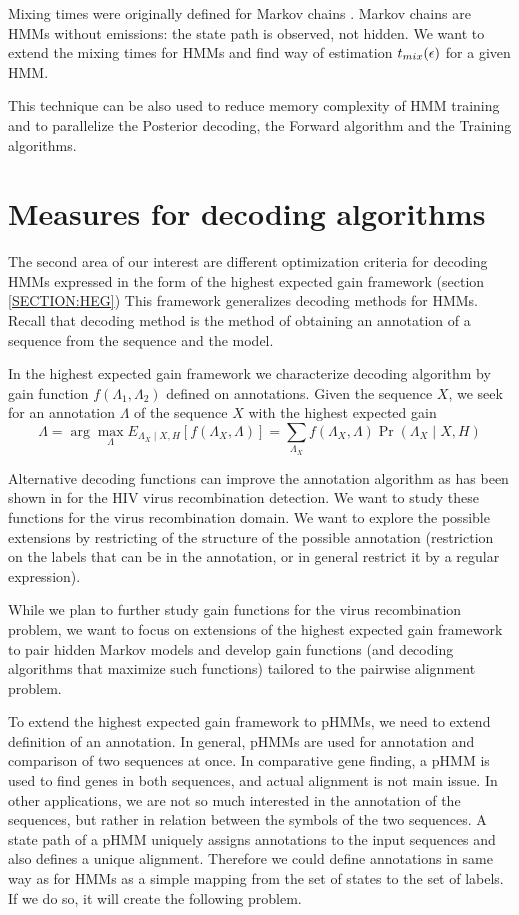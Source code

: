 Mixing times were originally defined for Markov chains \cite{Levin2006}. Markov
chains are HMMs without emissions: the state path is observed, not hidden. We
want to extend the mixing times for HMMs and find way of estimation $t_{mix}(\epsilon)$ for
a given HMM.

This technique can be also used to reduce memory complexity of HMM training and
to parallelize the Posterior decoding, the Forward algorithm and the
Training algorithms.

\section{Measures for decoding algorithms}

The second area of our interest are different optimization criteria for decoding
HMMs expressed in the form of the highest expected gain framework (section
\ref{SECTION:HEG}) This framework generalizes decoding methods for HMMs. Recall
that decoding method is the method of obtaining an annotation of a sequence from
the sequence and the model. 

In the highest expected gain framework we characterize decoding algorithm by
gain function $f(\Lambda_1,\Lambda_2)$ defined on annotations. Given the
sequence $X$, we seek for an annotation $\Lambda$ of the sequence $X$ with the
highest expected gain \[\Lambda = \arg\max_{\Lambda} E_{\Lambda_X\mid
X,H}[f(\Lambda_X,\Lambda)] =
\sum_{\Lambda_X}f(\Lambda_X,\Lambda)\Pr\left(\Lambda_X\mid X,H\right) \]


Alternative
decoding functions can improve the annotation algorithm as has been shown in
\cite{Nanasi2010,Truszkowski2011} for the HIV virus recombination detection.
We want to study these functions for the virus recombination domain. We
want to explore the  possible extensions by restricting of the structure of the
possible annotation (restriction on the labels that can be in the annotation, or
in general restrict it by a regular expression).

While we plan to further study gain functions for the virus recombination
problem, we want to focus on extensions of the highest expected gain framework to
pair hidden Markov models and develop gain functions (and decoding algorithms
that maximize such functions) tailored to the pairwise alignment problem. 

To extend the highest expected gain framework to pHMMs, we need to extend
definition of an annotation. In general, pHMMs are used for annotation and
comparison of two sequences at once. In comparative gene finding, a pHMM is used
to find genes in both sequences, and actual alignment is not main issue. In
other applications, we are not so much interested in the annotation of the
sequences, but rather in relation between the symbols of the two sequences. A
state path of a pHMM uniquely assigns annotations to the input sequences and
also defines a unique alignment.  Therefore we could define annotations in same
way as for HMMs as a simple mapping from the set of states to the set of labels.
If we do so, it will create the following problem.

